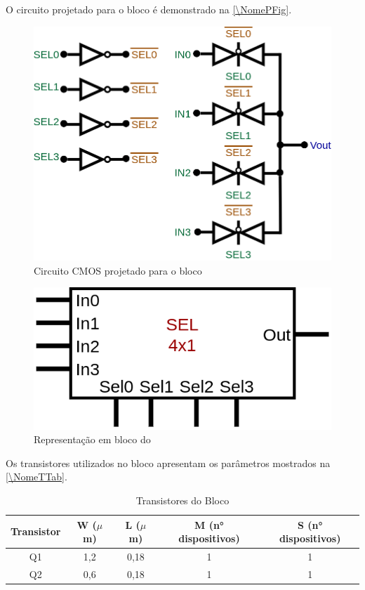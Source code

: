 O circuito projetado para o bloco \'e demonstrado na \autoref{\NomePFig}.

\begin{figure}[htb]
 \label{NomePFig}
 \centering
    \centering
    \caption{Circuito CMOS projetado para o bloco \NomeBloco} \label{\NomePFig}
    \includegraphics[scale=0.4]{Circuitos/sel4x1.png}
\end{figure}

\begin{figure}[htb]
 \label{NomeSFig}
 \centering
    \centering
    \caption{Representa{\c c}\~ao em bloco do \NomeBloco} \label{NomeSFig}
    \includegraphics[scale=0.5]{Circuitos/sel4x1_block.png}
\end{figure}

Os transistores utilizados no bloco \NomeBloco{} apresentam os par\^ametros mostrados na \autoref{\NomeTTab}.

\begin{table}[htbp]
\caption{Transistores do Bloco \NomeBloco}
\label{\NomeTTab}
\centering
\begin{tabular}{ccccc}
\toprule
Transistor & W ($\mu$m)  & L ($\mu$m)           & M (n° dispositivos) & S (n° dispositivos)\\
\midrule \midrule
Q1 & 1,2 & 0,18 & 1 & 1\\
\midrule
Q2 & 0,6 & 0,18 & 1 & 1\\
\bottomrule
\end{tabular}
\end{table}
\clearpage